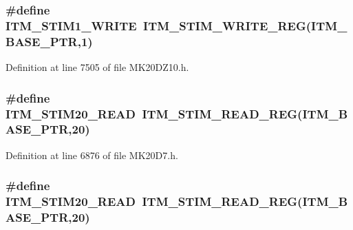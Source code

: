 \subsubsection[{\texorpdfstring{I\+T\+M\+\_\+\+S\+T\+I\+M1\+\_\+\+W\+R\+I\+TE}{ITM_STIM1_WRITE}}]{\setlength{\rightskip}{0pt plus 5cm}\#define I\+T\+M\+\_\+\+S\+T\+I\+M1\+\_\+\+W\+R\+I\+TE~{\bf I\+T\+M\+\_\+\+S\+T\+I\+M\+\_\+\+W\+R\+I\+T\+E\+\_\+\+R\+EG}({\bf I\+T\+M\+\_\+\+B\+A\+S\+E\+\_\+\+P\+TR},1)}\hypertarget{group___i_t_m___register___accessor___macros_gadb4269a2c1aae622c11d8e38853bf0d3}{}\label{group___i_t_m___register___accessor___macros_gadb4269a2c1aae622c11d8e38853bf0d3}


Definition at line 7505 of file M\+K20\+D\+Z10.\+h.

\subsubsection[{\texorpdfstring{I\+T\+M\+\_\+\+S\+T\+I\+M20\+\_\+\+R\+E\+AD}{ITM_STIM20_READ}}]{\setlength{\rightskip}{0pt plus 5cm}\#define I\+T\+M\+\_\+\+S\+T\+I\+M20\+\_\+\+R\+E\+AD~{\bf I\+T\+M\+\_\+\+S\+T\+I\+M\+\_\+\+R\+E\+A\+D\+\_\+\+R\+EG}({\bf I\+T\+M\+\_\+\+B\+A\+S\+E\+\_\+\+P\+TR},20)}\hypertarget{group___i_t_m___register___accessor___macros_gaec08b7ed3a53bdd0c49f608929a323ed}{}\label{group___i_t_m___register___accessor___macros_gaec08b7ed3a53bdd0c49f608929a323ed}


Definition at line 6876 of file M\+K20\+D7.\+h.

\subsubsection[{\texorpdfstring{I\+T\+M\+\_\+\+S\+T\+I\+M20\+\_\+\+R\+E\+AD}{ITM_STIM20_READ}}]{\setlength{\rightskip}{0pt plus 5cm}\#define I\+T\+M\+\_\+\+S\+T\+I\+M20\+\_\+\+R\+E\+AD~{\bf I\+T\+M\+\_\+\+S\+T\+I\+M\+\_\+\+R\+E\+A\+D\+\_\+\+R\+EG}({\bf I\+T\+M\+\_\+\+B\+A\+S\+E\+\_\+\+P\+TR},20)}\hypertarget{group___i_t_m___register___accessor___macros_gaec08b7ed3a53bdd0c49f608929a323ed}{}\label{group___i_t_m___register___accessor___macros_gaec08b7ed3a53bdd0c49f608929a323ed}



